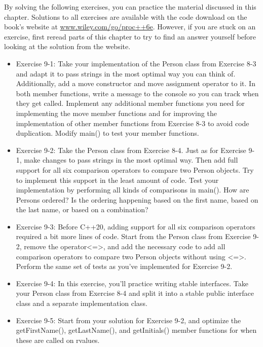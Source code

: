 
By solving the following exercises, you can practice the material discussed in this chapter. Solutions to all exercises are available with the code download on the book’s website at \url{www.wiley.com/go/proc++6e}. However, if you are stuck on an exercise, first reread parts of this chapter to try to find an answer yourself before looking at the solution from the website.

\begin{itemize}
\item
Exercise 9-1: Take your implementation of the Person class from Exercise 8-3 and adapt it to pass strings in the most optimal way you can think of. Additionally, add a move constructor and move assignment operator to it. In both member functions, write a message to the console so you can track when they get called. Implement any additional member functions you need for implementing the move member functions and for improving the implementation of other member functions from Exercise 8-3 to avoid code duplication. Modify main() to test your member functions.

\item
Exercise 9-2: Take the Person class from Exercise 8-4. Just as for Exercise 9-1, make changes to pass strings in the most optimal way. Then add full support for all six comparison operators to compare two Person objects. Try to implement this support in the least amount of code. Test your implementation by performing all kinds of comparisons in main(). How are Persons ordered? Is the ordering happening based on the first name, based on the last name, or based on a combination?

\item
Exercise 9-3: Before C++20, adding support for all six comparison operators required a bit more lines of code. Start from the Person class from Exercise 9-2, remove the operator<=>, and add the necessary code to add all comparison operators to compare two Person objects without using <=>. Perform the same set of tests as you’ve implemented for Exercise 9-2.

\item
Exercise 9-4: In this exercise, you’ll practice writing stable interfaces. Take your Person class from Exercise 8-4 and split it into a stable public interface class and a separate implementation class.

\item
Exercise 9-5: Start from your solution for Exercise 9-2, and optimize the getFirstName(), getLastName(), and getInitials() member functions for when these are called on rvalues.
\end{itemize}






